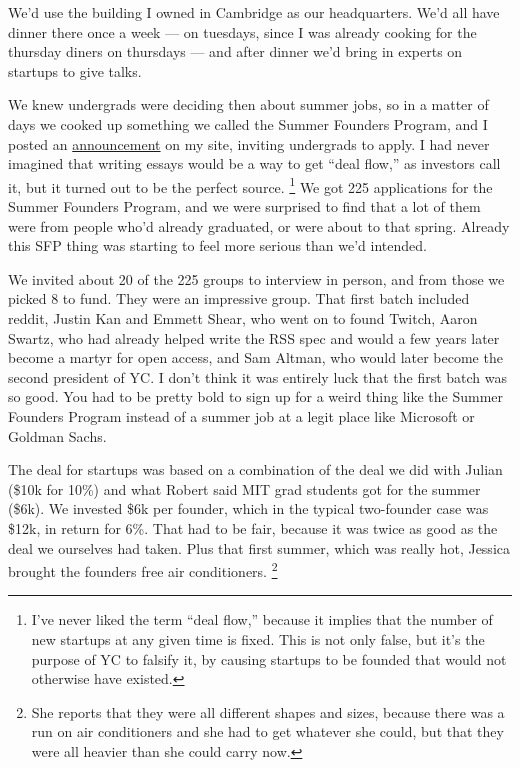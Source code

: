 \documentclass[12pt]{book}
\begin{document}
We'd use the building I owned in Cambridge as our headquarters. We'd all
have dinner there once a week --- on tuesdays, since I was already
cooking for the thursday diners on thursdays --- and after dinner we'd
bring in experts on startups to give talks.

We knew undergrads were deciding then about summer jobs, so in a matter
of days we cooked up something we called the Summer Founders Program,
and I posted an \href{summerfounder.html}{announcement} on my site,
inviting undergrads to apply. I had never imagined that writing essays
would be a way to get ``deal flow,'' as investors call it, but it turned
out to be the perfect source. \footnote{I've never liked the term ``deal flow,'' because it implies
that the number of new startups at any given time is fixed. This is not
only false, but it's the purpose of YC to falsify it, by causing
startups to be founded that would not otherwise have existed.} We got 225
applications for the Summer Founders Program, and we were surprised to
find that a lot of them were from people who'd already graduated, or
were about to that spring. Already this SFP thing was starting to feel
more serious than we'd intended.

We invited about 20 of the 225 groups to interview in person, and from
those we picked 8 to fund. They were an impressive group. That first
batch included reddit, Justin Kan and Emmett Shear, who went on to found
Twitch, Aaron Swartz, who had already helped write the RSS spec and
would a few years later become a martyr for open access, and Sam Altman,
who would later become the second president of YC. I don't think it was
entirely luck that the first batch was so good. You had to be pretty
bold to sign up for a weird thing like the Summer Founders Program
instead of a summer job at a legit place like Microsoft or Goldman
Sachs.

The deal for startups was based on a combination of the deal we did with
Julian (\$10k for 10\%) and what Robert said MIT grad students got for
the summer (\$6k). We invested \$6k per founder, which in the typical
two-founder case was \$12k, in return for 6\%. That had to be fair,
because it was twice as good as the deal we ourselves had taken. Plus
that first summer, which was really hot, Jessica brought the founders
free air conditioners. \footnote{She reports that they were all different shapes and sizes,
because there was a run on air conditioners and she had to get whatever
she could, but that they were all heavier than she could carry now.}
\end{document}
